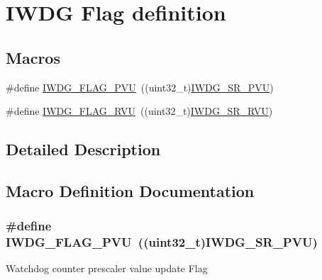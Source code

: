 \hypertarget{group___i_w_d_g___flag__definition}{}\section{I\+W\+DG Flag definition}
\label{group___i_w_d_g___flag__definition}
\subsection*{Macros}
\begin{DoxyCompactItemize}
\item 
\#define \hyperlink{group___i_w_d_g___flag__definition_gae20afcf399fad1534e79a8d30ea86c9c}{I\+W\+D\+G\+\_\+\+F\+L\+A\+G\+\_\+\+P\+VU}~((uint32\+\_\+t)\hyperlink{group___peripheral___registers___bits___definition_ga269bd5618ba773d32275b93be004c554}{I\+W\+D\+G\+\_\+\+S\+R\+\_\+\+P\+VU})
\item 
\#define \hyperlink{group___i_w_d_g___flag__definition_ga3731bf2711c234ffe5b405fb6634ebca}{I\+W\+D\+G\+\_\+\+F\+L\+A\+G\+\_\+\+R\+VU}~((uint32\+\_\+t)\hyperlink{group___peripheral___registers___bits___definition_gadffb8339e556a3b10120b15f0dacc232}{I\+W\+D\+G\+\_\+\+S\+R\+\_\+\+R\+VU})
\end{DoxyCompactItemize}


\subsection{Detailed Description}


\subsection{Macro Definition Documentation}
\subsubsection[{\texorpdfstring{I\+W\+D\+G\+\_\+\+F\+L\+A\+G\+\_\+\+P\+VU}{IWDG_FLAG_PVU}}]{\setlength{\rightskip}{0pt plus 5cm}\#define I\+W\+D\+G\+\_\+\+F\+L\+A\+G\+\_\+\+P\+VU~((uint32\+\_\+t){\bf I\+W\+D\+G\+\_\+\+S\+R\+\_\+\+P\+VU})}\hypertarget{group___i_w_d_g___flag__definition_gae20afcf399fad1534e79a8d30ea86c9c}{}\label{group___i_w_d_g___flag__definition_gae20afcf399fad1534e79a8d30ea86c9c}
Watchdog counter prescaler value update Flag 
